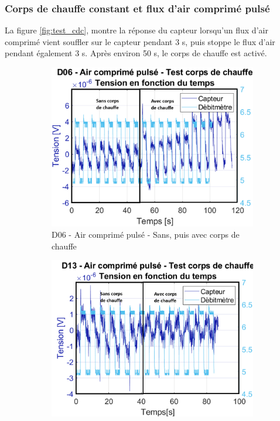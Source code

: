 \subsubsection{Corps de chauffe constant et flux d'air comprimé pulsé}
La figure \ref{fig:test_cdc}, montre la réponse du capteur lorsqu'un flux d'air comprimé vient souffler sur le capteur pendant 3 s, puis 
stoppe le flux d'air pendant également 3 s. Après environ 50 s, le corps de chauffe est activé. 
\begin{figure}[H]
    \hspace{-0.3cm}
    \begin{subfigure}{0.45\textwidth}
        \includegraphics[scale = 0.4]{assets/figures/D06_air_pulse_test_cdc.png}
        \caption{D06 - Air comprimé pulsé - Sans, puis avec corps de chauffe}
        \label{fig:d06_test_cdc}
    \end{subfigure}
    \hspace{0.5cm}
    \begin{subfigure}{0.45\textwidth}
        \includegraphics[scale = 0.4]{assets/figures/D13_air_comprime_pulse_test_cdc.png}

\end{subfigure}
\end{figure}
